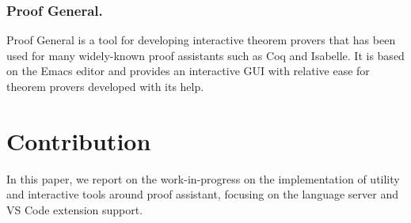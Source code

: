 \subsubsection{Proof General.}

Proof General \cite{Aspinall2000} is a tool for developing interactive theorem
provers that has been used for many widely-known proof assistants such as Coq
and Isabelle.
It is based on the Emacs editor and provides an interactive GUI with relative
ease for theorem provers developed with its help.



\section{Contribution}

In this paper, we report on the work-in-progress on the implementation of
utility and interactive tools around \Rzk{} proof assistant, focusing on
the language server and VS Code extension support.
